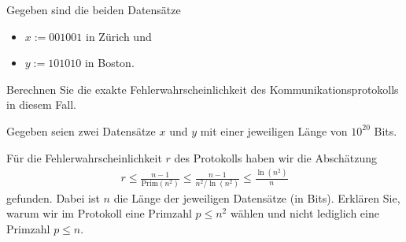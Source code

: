 \begin{questions}
\question[3] Gegeben sind die beiden Datensätze
\begin{itemize}
  \item $x := 001001$ in Zürich und
  \item $y := 101010$ in Boston.
\end{itemize}
Berechnen Sie die exakte Fehlerwahrscheinlichkeit des Kommunikationsprotokolls in diesem Fall.


\question Gegeben seien zwei Datensätze $x$ und $y$ mit einer jeweiligen Länge von $10^{20}$ Bits. 
\droptotalpoints


\question[2]
Für die Fehlerwahrscheinlichkeit $r$ des Protokolls haben wir die Abschätzung
\begin{align*}
    r \leq \frac{n-1}{\text{Prim}(n^2)}\leq \frac{n-1}{n^2/\ln(n^2)}\leq\frac{\ln(n^2)}{n}
\end{align*}
gefunden. Dabei ist $n$ die Länge der jeweiligen Datensätze (in Bits). Erklären Sie, warum wir im Protokoll eine Primzahl $p \leq n^2$ wählen und nicht lediglich eine Primzahl $p \leq n$.
\end{questions}
